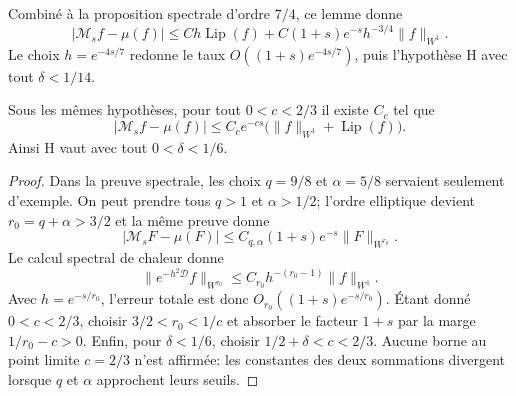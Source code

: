 Combiné à la proposition spectrale d'ordre $7/4$, ce lemme donne
\[
 |\mathcal M_s f-\mu(f)|
 \le Ch\operatorname{Lip}(f)
     +C(1+s)e^{-s}h^{-3/4}\|f\|_{W^1}.
\]
Le choix $h=e^{-4s/7}$ redonne le taux
$O((1+s)e^{-4s/7})$, puis l'hypothèse H avec tout $\delta<1/14$.

\begin{corollary}
Sous les mêmes hypothèses, pour tout $0<c<2/3$ il existe $C_c$ tel que
\[
 |\mathcal M_s f-\mu(f)|
 \le C_c e^{-cs}
       \bigl(\|f\|_{W^1}+\operatorname{Lip}(f)\bigr).
\]
Ainsi H vaut avec tout $0<\delta<1/6$.
\end{corollary}

\begin{proof}
Dans la preuve spectrale, les choix $q=9/8$ et $\alpha=5/8$ servaient
seulement d'exemple. On peut prendre tous $q>1$ et $\alpha>1/2$;
l'ordre elliptique devient $r_0=q+\alpha>3/2$ et la même preuve donne
\[
 |\mathcal M_s F-\mu(F)|
 \le C_{q,\alpha}(1+s)e^{-s}\|F\|_{W^{r_0}}.
\]
Le calcul spectral de chaleur donne
\[
 \|e^{-h^2\mathcal D}f\|_{W^{r_0}}
 \le C_{r_0}h^{-(r_0-1)}\|f\|_{W^1}.
\]
Avec $h=e^{-s/r_0}$, l'erreur totale est donc
$O_{r_0}((1+s)e^{-s/r_0})$. Étant donné $0<c<2/3$, choisir
$3/2<r_0<1/c$ et absorber le facteur $1+s$ par la marge
$1/r_0-c>0$. Enfin, pour $\delta<1/6$, choisir
$1/2+\delta<c<2/3$. Aucune borne au point limite $c=2/3$ n'est affirmée:
les constantes des deux sommations divergent lorsque $q$ et $\alpha$
approchent leurs seuils.
\end{proof}
